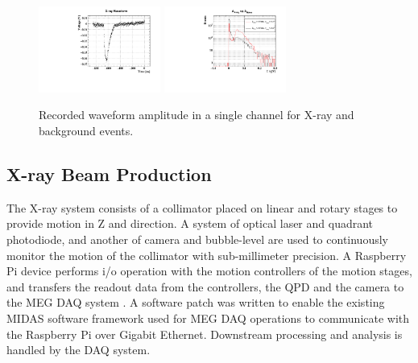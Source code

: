 \begin{figure}[]
\centering
\includegraphics[width=4cm]{plots/2018/XrayWF_MPPC67}
\includegraphics[width=4cm]{plots/2018/Sel2_2}
\caption{Recorded waveform amplitude in a single channel for X-ray and background events.}
\label{fig:pulseheight}
\end{figure}  


\subsection{X-ray Beam Production}
The X-ray system consists of a collimator placed on linear and rotary stages to
provide motion in Z and \phis direction.  A system of optical laser and
quadrant photodiode, and another of camera and bubble-level are used to
continuously monitor the motion of the collimator  with sub-millimeter
precision.  A Raspberry Pi device performs i/o operation with the motion
controllers of the motion stages, and transfers the readout data from the
controllers, the QPD and the camera to the MEG DAQ system \cite{megsoftware}.
A software patch was written to enable the existing MIDAS software framework
\cite{midas} used for MEG DAQ operations to communicate with the Raspberry Pi
over Gigabit Ethernet.  Downstream processing and analysis is handled by the
DAQ system.
 



